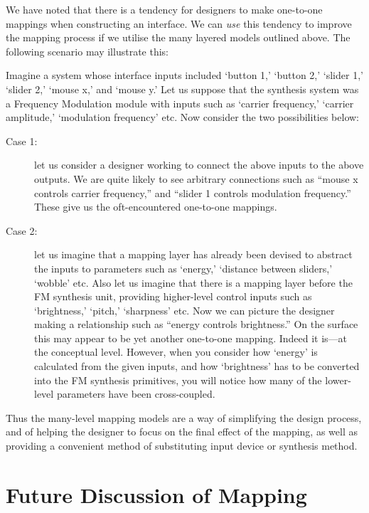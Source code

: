 We have noted that there is a tendency for designers to make one-to-one mappings
when constructing an interface.  We can \textit{use} this tendency to improve the
mapping process if we utilise the many layered models outlined above.  The
following scenario may illustrate this:

Imagine a system whose interface inputs included `button 1,' `button 2,'  `slider
1,' `slider 2,' `mouse x,' and `mouse y.'  Let us suppose that the synthesis system
was a Frequency Modulation module with inputs such as `carrier frequency,'
`carrier amplitude,' `modulation frequency' etc.  Now consider the two
possibilities below:

	
\begin{description}
\item[Case 1:] let us consider a designer working to connect the above inputs
to the above outputs.  We are quite likely to see arbitrary connections such as 
``mouse x controls carrier frequency,'' and ``slider 1 controls modulation
frequency.''  These give us the oft-encountered one-to-one mappings.

\item[Case 2:] let us imagine that a mapping layer has already been devised to
abstract the inputs to parameters such as `energy,' `distance between sliders,'
`wobble' etc.  Also let us imagine that there is a mapping layer before the FM
synthesis unit, providing higher-level control inputs such as `brightness,'
`pitch,' `sharpness' etc.  Now we can picture the designer making a relationship
such as ``energy controls brightness.''  On the surface this may appear to be yet
another one-to-one mapping.  Indeed it is---at the conceptual level. 
However, when you consider how `energy' is calculated from the given inputs, and
how `brightness' has to be converted into the FM synthesis primitives, you will
notice how many of the lower-level parameters have been cross-coupled.

\end{description}


Thus the many-level mapping models are a way of simplifying the design process,
and of helping the designer to focus on the final effect of the mapping, as well
as providing a convenient method of substituting input device or synthesis
method.

\section{Future Discussion of Mapping}

